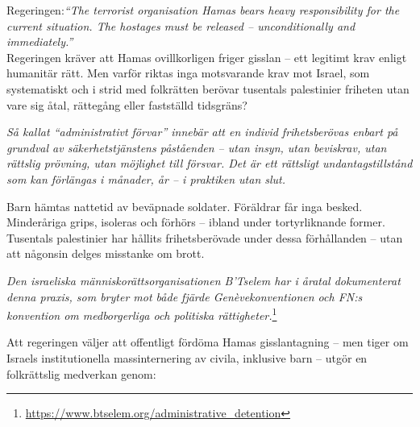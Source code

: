 Regeringen:\textit{“The terrorist organisation Hamas bears heavy responsibility for the current situation. The hostages must be released – unconditionally and immediately.”}\\

Regeringen kräver att Hamas ovillkorligen friger gisslan – ett legitimt krav enligt humanitär rätt. Men varför riktas inga motsvarande krav mot Israel, som systematiskt och i strid med folkrätten berövar tusentals palestinier friheten utan vare sig åtal, rättegång eller fastställd tidsgräns?

\textit{Så kallat “administrativt förvar” innebär att en individ frihetsberövas enbart på grundval av säkerhetstjänstens påståenden – utan insyn, utan beviskrav, utan rättslig prövning, utan möjlighet till försvar. Det är ett rättsligt undantagstillstånd som kan förlängas i månader, år – i praktiken utan slut.}

Barn hämtas nattetid av beväpnade soldater. Föräldrar får inga besked. Minderåriga grips, isoleras och förhörs – ibland under tortyrliknande former. Tusentals palestinier har hållits frihetsberövade under dessa förhållanden – utan att någonsin delges misstanke om brott.

\textit{Den israeliska människorättsorganisationen B’Tselem har i åratal dokumenterat denna praxis, som bryter mot både fjärde Genèvekonventionen och FN:s konvention om medborgerliga och politiska rättigheter.}\footnote{\url{https://www.btselem.org/administrative_detention}}

Att regeringen väljer att offentligt fördöma Hamas gisslantagning – men tiger om Israels institutionella massinternering av civila, inklusive barn – utgör en folkrättslig medverkan genom:

